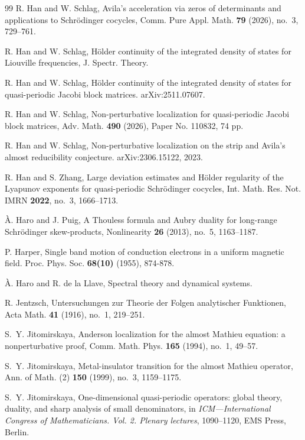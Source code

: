 \documentclass[reqno,11pt]{amsart}
\begin{document}
\begin{thebibliography}{99}
 R. Han and W. Schlag, Avila's acceleration via zeros of determinants and applications to Schr\"odinger cocycles, Comm. Pure Appl. Math. {\bf 79} (2026), no.~3, 729--761.

R. Han and W. Schlag, H\"older continuity of the integrated density of states for Liouville frequencies, J. Spectr. Theory.

R. Han and W. Schlag, H\"older continuity of the integrated density of states for quasi-periodic Jacobi block matrices. arXiv:2511.07607.


R. Han and W. Schlag, Non-perturbative localization for quasi-periodic Jacobi block matrices, Adv. Math. {\bf 490} (2026), Paper No. 110832, 74 pp.

R. Han and W. Schlag, Non-perturbative localization on the strip and Avila's almost reducibility conjecture. arXiv:2306.15122, 2023.



R. Han and S. Zhang, Large deviation estimates and H\"older regularity of the Lyapunov exponents for quasi-periodic Schr\"odinger cocycles, Int. Math. Res. Not. IMRN {\bf 2022}, no.~3, 1666--1713.

\`A. Haro and J. Puig, A Thouless formula and Aubry duality for long-range Schr\"odinger skew-products, Nonlinearity {\bf 26} (2013), no.~5, 1163--1187.


  P. Harper, Single band motion of conduction electrons in a uniform magnetic field.  Proc. Phys. Soc. {\bf68(10)} (1955), 874-878.

\`A. Haro and R. de la Llave, Spectral theory and dynamical systems.

R. Jentzsch, Untersuchungen zur Theorie der Folgen analytischer Funktionen, Acta Math. {\bf 41} (1916), no.~1, 219--251.







    S.~Y. Jitomirskaya, Anderson localization for the almost Mathieu equation: a nonperturbative proof, Comm. Math. Phys. {\bf 165} (1994), no.~1, 49--57.
  
	S.~Y. Jitomirskaya, Metal-insulator transition for the almost Mathieu operator, Ann. of Math. (2) {\bf 150} (1999), no.~3, 1159--1175.

S.~Y. Jitomirskaya, One-dimensional quasi-periodic operators: global theory, duality, and sharp analysis of small denominators, in {\it ICM---International Congress of Mathematicians. Vol. 2. Plenary lectures}, 1090--1120, EMS Press, Berlin.


\end{thebibliography}
\end{document}
